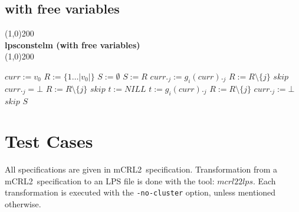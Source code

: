 \index{}\documentclass[a4paper,10pt]{article}
\theoremstyle{plain}
\theoremstyle{definition}
\newcommand{\mcrl}{mCRL2}
\begin{document}
\subsection{with free variables}
\line(1,0){200}\\
\textbf{lpsconstelm (with free variables)}\\
\line(1,0){200}
\begin{algorithmic}[1]
\STATE $curr := v_0$
\STATE $R := \lbrace 1 \ldots \vert v_0 \vert \rbrace $
\STATE $S := \emptyset $
    \STATE $S := R$
              \STATE $ curr._j := g_i(curr)._j $
                \STATE $R:= R \setminus \lbrace j \rbrace $
	      \ENDIF
               \STATE $ skip $
            \ENDIF
              \STATE $curr._j = \bot$
              \STATE $R := R \setminus \lbrace j \rbrace$
              \STATE $skip$
            \ENDIF
          \ENDIF 
        \ENDFOR
    \ENDFOR 
  \ENDWHILE \newline
    \STATE $t:= NILL$
        \STATE $ t := g_i(curr)._j $
        \STATE $ R := R \setminus \lbrace j \rbrace$
        \STATE $ curr._j := \bot $
        \STATE $skip$
      \ENDIF
    \ENDFOR
  \ENDFOR
\ENDWHILE
\RETURN $S$
\end{algorithmic}
\newpage

\section{Test Cases}
All specifications are given in \mcrl\ specification.
Transformation from a \mcrl\ specification to an LPS file is done with the tool:
$mcrl22lps$. Each transformation is executed with the \verb"-no-cluster" option, unless
mentioned otherwise.
\end{document}

